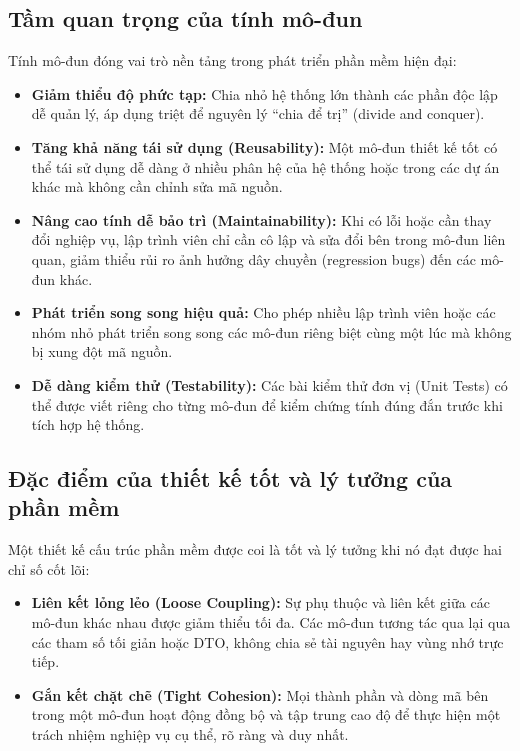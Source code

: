 \documentclass[12pt,a4paper]{article}
\begin{document}
\subsection{Tầm quan trọng của tính mô-đun}
Tính mô-đun đóng vai trò nền tảng trong phát triển phần mềm hiện đại:
\begin{itemize}
    \item \textbf{Giảm thiểu độ phức tạp:} Chia nhỏ hệ thống lớn thành các phần độc lập dễ quản lý, áp dụng triệt để nguyên lý ``chia để trị'' (divide and conquer).
    \item \textbf{Tăng khả năng tái sử dụng (Reusability):} Một mô-đun thiết kế tốt có thể tái sử dụng dễ dàng ở nhiều phân hệ của hệ thống hoặc trong các dự án khác mà không cần chỉnh sửa mã nguồn.
    \item \textbf{Nâng cao tính dễ bảo trì (Maintainability):} Khi có lỗi hoặc cần thay đổi nghiệp vụ, lập trình viên chỉ cần cô lập và sửa đổi bên trong mô-đun liên quan, giảm thiểu rủi ro ảnh hưởng dây chuyền (regression bugs) đến các mô-đun khác.
    \item \textbf{Phát triển song song hiệu quả:} Cho phép nhiều lập trình viên hoặc các nhóm nhỏ phát triển song song các mô-đun riêng biệt cùng một lúc mà không bị xung đột mã nguồn.
    \item \textbf{Dễ dàng kiểm thử (Testability):} Các bài kiểm thử đơn vị (Unit Tests) có thể được viết riêng cho từng mô-đun để kiểm chứng tính đúng đắn trước khi tích hợp hệ thống.
\end{itemize}

\subsection{Đặc điểm của thiết kế tốt và lý tưởng của phần mềm}
Một thiết kế cấu trúc phần mềm được coi là tốt và lý tưởng khi nó đạt được hai chỉ số cốt lõi:
\begin{itemize}
    \item \textbf{Liên kết lỏng lẻo (Loose Coupling):} Sự phụ thuộc và liên kết giữa các mô-đun khác nhau được giảm thiểu tối đa. Các mô-đun tương tác qua lại qua các tham số tối giản hoặc DTO, không chia sẻ tài nguyên hay vùng nhớ trực tiếp.
    \item \textbf{Gắn kết chặt chẽ (Tight Cohesion):} Mọi thành phần và dòng mã bên trong một mô-đun hoạt động đồng bộ và tập trung cao độ để thực hiện một trách nhiệm nghiệp vụ cụ thể, rõ ràng và duy nhất.
\end{itemize}
\end{document}
